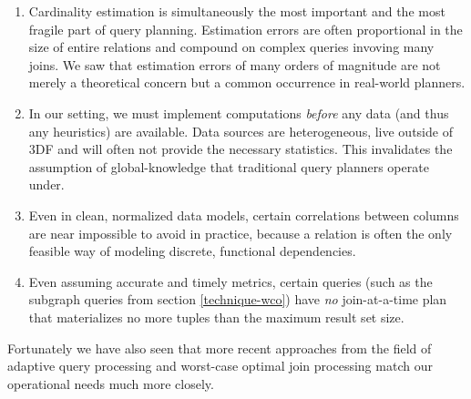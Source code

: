 \documentclass[../index.tex]{subfiles}
\begin{document}
\begin{enumerate}
  \item
    Cardinality estimation is simultaneously the most important and
    the most fragile part of query planning. Estimation errors are
    often proportional in the size of entire relations and compound on
    complex queries invoving many joins. We saw that estimation errors
    of many orders of magnitude are not merely a theoretical concern
    but a common occurrence in real-world planners.

  \item
    In our setting, we must implement computations \emph{before} any
    data (and thus any heuristics) are available. Data sources are
    heterogeneous, live outside of 3DF and will often not provide the
    necessary statistics. This invalidates the assumption of
    global-knowledge that traditional query planners operate under.

  \item
    Even in clean, normalized data models, certain correlations
    between columns are near impossible to avoid in practice, because
    a relation is often the only feasible way of modeling discrete,
    functional dependencies.

  \item
    Even assuming accurate and timely metrics, certain queries (such
    as the subgraph queries from section \ref{technique-wco}) have
    \emph{no} join-at-a-time plan that materializes no more tuples
    than the maximum result set size.
\end{enumerate}

Fortunately we have also seen that more recent approaches from the
field of adaptive query processing and worst-case optimal join
processing match our operational needs much more closely.
\end{document}
